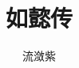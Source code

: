 \documentclass[12pt,oneside]{book}
\begin{document}
\title{如懿传}
\author{流潋紫}

\makemytitleA
\end{document}
